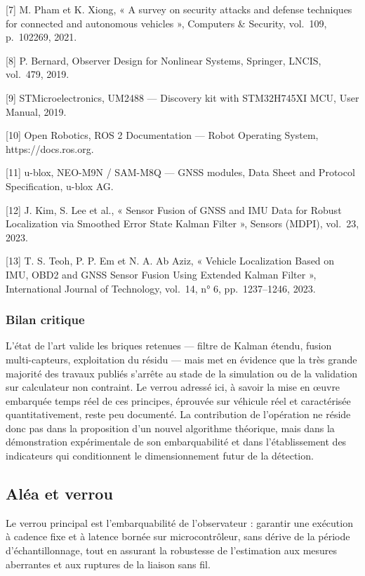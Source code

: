 \documentclass[11pt,a4paper]{article}
\begin{document}
[7] M. Pham et K. Xiong, « A survey on security attacks and defense techniques for connected and autonomous vehicles », Computers \& Security, vol.~109, p.~102269, 2021.

[8] P. Bernard, Observer Design for Nonlinear Systems, Springer, LNCIS, vol.~479, 2019.

[9] STMicroelectronics, UM2488 — Discovery kit with STM32H745XI MCU, User Manual, 2019.

[10] Open Robotics, ROS 2 Documentation — Robot Operating System, https://docs.ros.org.

[11] u-blox, NEO-M9N / SAM-M8Q — GNSS modules, Data Sheet and Protocol Specification, u-blox AG.

[12] J. Kim, S. Lee et al., « Sensor Fusion of GNSS and IMU Data for Robust Localization via Smoothed Error State Kalman Filter », Sensors (MDPI), vol.~23, 2023.

[13] T. S. Teoh, P. P. Em et N. A. Ab Aziz, « Vehicle Localization Based on IMU, OBD2 and GNSS Sensor Fusion Using Extended Kalman Filter », International Journal of Technology, vol.~14, n° 6, pp.~1237–1246, 2023.

\subsubsection{Bilan critique}

L’état de l’art valide les briques retenues — filtre de Kalman étendu, fusion multi-capteurs, exploitation du résidu — mais met en évidence que la très grande majorité des travaux publiés s’arrête au stade de la simulation ou de la validation sur calculateur non contraint. Le verrou adressé ici, à savoir la mise en œuvre embarquée temps réel de ces principes, éprouvée sur véhicule réel et caractérisée quantitativement, reste peu documenté. La contribution de l’opération ne réside donc pas dans la proposition d’un nouvel algorithme théorique, mais dans la démonstration expérimentale de son embarquabilité et dans l’établissement des indicateurs qui conditionnent le dimensionnement futur de la détection.

\subsection{Aléa et verrou}

Le verrou principal est l’embarquabilité de l’observateur : garantir une exécution à cadence fixe et à latence bornée sur microcontrôleur, sans dérive de la période d’échantillonnage, tout en assurant la robustesse de l’estimation aux mesures aberrantes et aux ruptures de la liaison sans fil.
\end{document}
